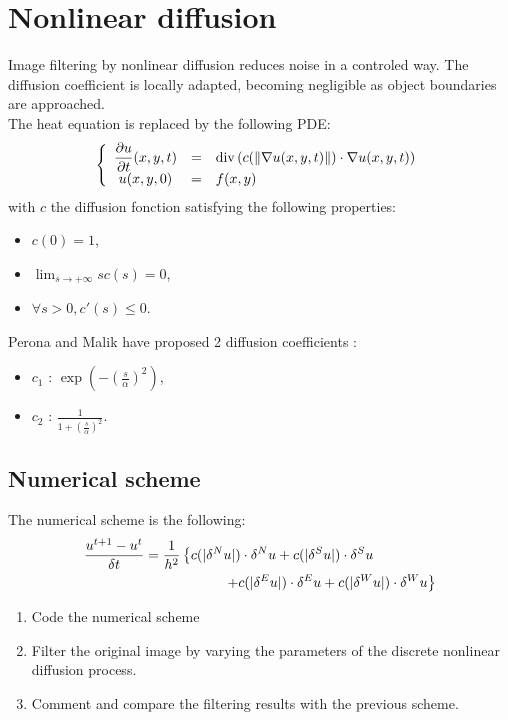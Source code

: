 \section{Nonlinear diffusion}
Image filtering by nonlinear diffusion reduces noise in a controled way. The diffusion coefficient is locally adapted, becoming negligible as object boundaries are approached.\\
The heat equation is replaced by the following PDE:
\begin{eqnarray}
\left\{\begin{array}{ccl}
\displaystyle \frac{\partial u}{\partial t}(x,y,t)&=&\operatorname*{div}\left(c(\|\nabla u(x,y,t)\|)\cdot\nabla u(x,y,t)\right)\\
u(x,y,0)&=&f(x,y)
\end{array}
\right.
\end{eqnarray}
with $c$ the diffusion fonction satisfying the following properties:
\begin{itemize}
	\item $c(0)=1$,
	\item $\displaystyle \lim_{s\rightarrow +\infty}sc(s)=0$,
	\item $\forall s>0, c'(s)\leq 0$.
\end{itemize}

\noindent Perona and Malik have proposed 2 diffusion coefficients \cite{Perona1990,Catte1992}:
\begin{itemize}
	\item $c_1$ : $\displaystyle \exp\left(-\left(\displaystyle\frac{s}{\alpha}\right)^2\right)$,
	\item $c_2$ : $\displaystyle \frac{1}{1+\left(\displaystyle\frac{s}{\alpha}\right)^2}$.
\end{itemize}

\subsection{Numerical scheme}
The numerical scheme is the following:
\begin{align}\frac{u^{t+1}-u^t}{\delta t} &= \frac{1}{h^2}\left\{ c(|\delta^N u|)\cdot \delta^N u + c(|\delta^S u|)\cdot \delta^S u \right. \\
            &\hspace*{2cm} \left. + c(|\delta^E u|)\cdot \delta^E u + c(|\delta^W u|)\cdot \delta^W u \right\}\nonumber
\end{align}
\begin{qbox}

\begin{enumerate}
	\item Code the numerical scheme
	\item Filter the original image by varying the parameters of the discrete nonlinear diffusion process.
	\item Comment and compare the filtering results with the previous scheme.
\end{enumerate}
\end{qbox}

